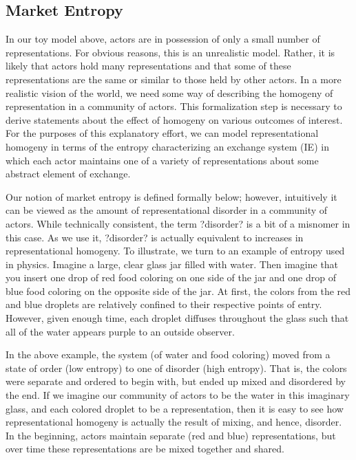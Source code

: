 \subsection{Market Entropy}
In our toy model above, actors are in possession of only a small number of representations. For obvious reasons, this is an unrealistic model. Rather, it is likely that actors hold many representations and that some of these representations are the same or similar to those held by other actors. In a more realistic vision of the world, we need some way of describing the homogeny of representation in a community of actors. This formalization step is necessary to derive statements about the effect of homogeny on various outcomes of interest. For the purposes of this explanatory effort, we can model representational homogeny in terms of the entropy characterizing an exchange system (IE) in which each actor maintains one of a variety of representations about some abstract element of exchange.  
 
Our notion of market entropy is defined formally below; however, intuitively it can be viewed as the amount of representational disorder in a community of actors. While technically consistent, the term ?disorder? is a bit of a misnomer in this case. As we use it, ?disorder? is actually equivalent to increases in representational homogeny. To illustrate, we turn to an example of entropy used in physics. Imagine a large, clear glass jar filled with water. Then imagine that you insert one drop of red food coloring on one side of the jar and one drop of blue food coloring on the opposite side of the jar. At first, the colors from the red and blue droplets are relatively confined to their respective points of entry. However, given enough time, each droplet diffuses throughout the glass such that all of the water appears purple to an outside observer. 
 
In the above example, the system (of water and food coloring) moved from a state of order (low entropy) to one of disorder (high entropy). That is, the colors were separate and ordered to begin with, but ended up mixed and disordered by the end. If we imagine our community of actors to be the water in this imaginary glass, and each colored droplet to be a representation, then it is easy to see how representational homogeny is actually the result of mixing, and hence, disorder. In the beginning, actors maintain separate (red and blue) representations, but over time these representations are be mixed together and shared.
 
